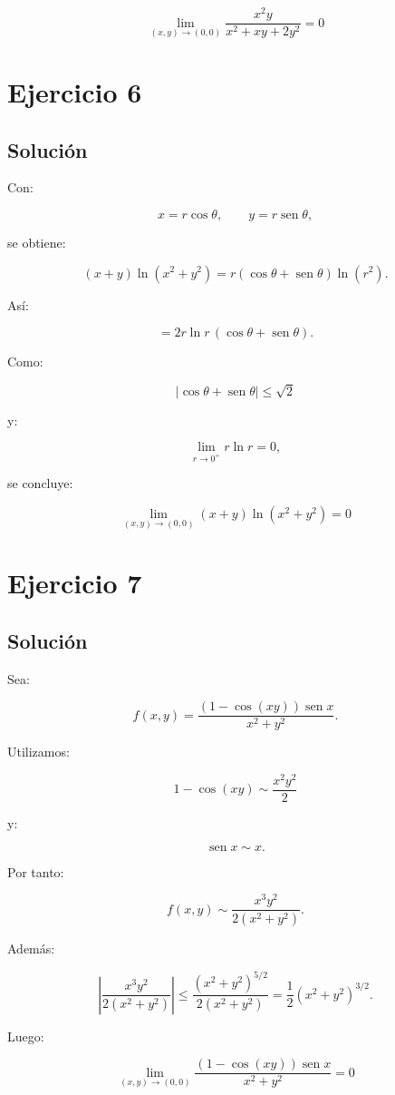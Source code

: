 \documentclass[11pt,a4paper]{article}
\newcommand{\sen}{\operatorname{sen}}
\begin{document}
\[
\boxed{
\lim_{(x,y)\to(0,0)}
\frac{x^2y}{x^2+xy+2y^2}
=
0
}
\]

\section{Ejercicio 6}
\subsection{Solución}

Con:

\[
x=r\cos\theta,
\qquad
y=r\sen\theta,
\]

se obtiene:

\[
(x+y)\ln(x^2+y^2)
=
r(\cos\theta+\sen\theta)\ln(r^2).
\]

Así:

\[
=
2r\ln r\,(\cos\theta+\sen\theta).
\]

Como:

\[
|\cos\theta+\sen\theta|
\leq
\sqrt2
\]

y:

\[
\lim_{r\to0^+}r\ln r=0,
\]

se concluye:

\[
\boxed{
\lim_{(x,y)\to(0,0)}
(x+y)\ln(x^2+y^2)
=
0
}
\]

\section{Ejercicio 7}
\subsection{Solución}

Sea:

\[
f(x,y)
=
\frac{(1-\cos(xy))\sen x}{x^2+y^2}.
\]

Utilizamos:

\[
1-\cos(xy)
\sim
\frac{x^2y^2}{2}
\]

y:

\[
\sen x\sim x.
\]

Por tanto:

\[
f(x,y)
\sim
\frac{x^3y^2}{2(x^2+y^2)}.
\]

Además:

\[
\left|
\frac{x^3y^2}{2(x^2+y^2)}
\right|
\leq
\frac{(x^2+y^2)^{5/2}}
{2(x^2+y^2)}
=
\frac12(x^2+y^2)^{3/2}.
\]

Luego:

\[
\boxed{
\lim_{(x,y)\to(0,0)}
\frac{(1-\cos(xy))\sen x}{x^2+y^2}
=
0
}
\]
\end{document}
